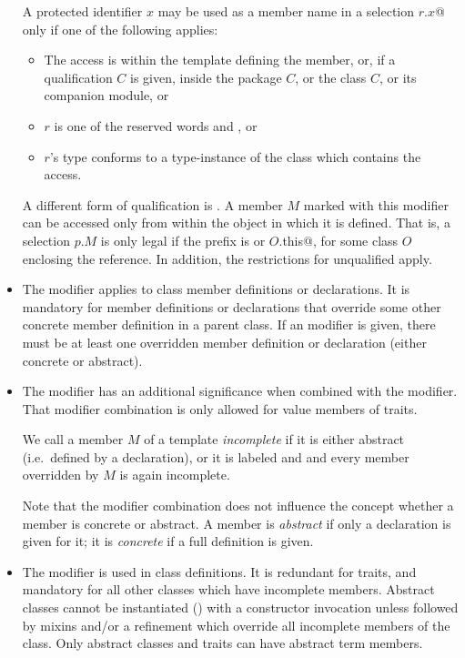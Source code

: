 \begin{itemize}
A protected identifier $x$ may be used as a member name in a selection
\lstinline@$r$.$x$@ only if one of the following applies:
\begin{itemize}
\item The access is within the template defining the member, or, if
  a qualification $C$ is given, inside the package $C$,
  or the class $C$, or its companion module, or
\item $r$ is one of the reserved words  and
  , or
\item $r$'s type conforms to a type-instance of the
  class which contains the access.
\end{itemize}

A different form of qualification is . A member
$M$ marked with this modifier can be accessed only from within
the object in which it is defined. That is, a selection $p.M$ is only
legal if the prefix is  or \lstinline@$O$.this@, for some
class $O$ enclosing the reference. In addition, the restrictions for
unqualified  apply.

\item
The  modifier applies to class member definitions or declarations.  It
is mandatory for member definitions or declarations that override some other concrete
member definition in a parent class. If an 
modifier is given, there must be at least one overridden member
definition or declaration (either concrete or abstract).  
\item
The  modifier has an additional significance when
combined with the  modifier.  That modifier combination
is only allowed for value members of traits.  

We call a member $M$ of a template {\em incomplete} if it is either
abstract (i.e.\ defined by a declaration), or it is labeled
 and  and 
every member overridden by $M$ is again incomplete. 

Note that the  modifier combination does not
influence the concept whether a member is concrete or abstract. A
member is {\em abstract} if only a declaration is given for it; it is
{\em concrete} if a full definition is given.
\item
The  modifier is used in class definitions. It is
redundant for traits, and mandatory for all other classes which have
incomplete members.  Abstract classes cannot be instantiated
() with a constructor invocation unless
followed by mixins and/or a refinement which override all
incomplete members of the class. Only abstract classes and traits can have
abstract term members.


\end{itemize}
